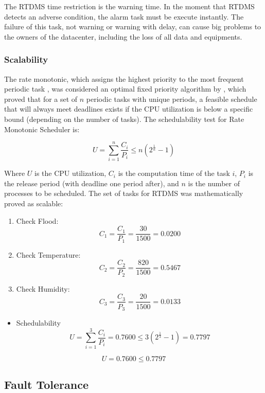 \documentclass[12pt]{article}
\begin{document}
The RTDMS time restriction is the warning time. In the moment that RTDMS detects an adverse condition,
the alarm task must be execute instantly. The failure of this task, not warning or warning with delay,
can cause big problems to the owners of the datacenter, including the loss of all data and equipments.

\subsubsection{Scalability}

The rate monotonic, which assigns the highest priority to the most frequent periodic task \cite{stankovic1996real}, 
was considered an optimal fixed priority algorithm by \cite{liu1973scheduling}, which proved that for 
a set of \(n\) periodic tasks with unique periods, a feasible schedule that will always meet deadlines 
exists if the CPU utilization is below a specific bound (depending on the number of tasks). The schedulability 
test for Rate Monotonic Scheduler is:

\[ \displaystyle U = \sum_{i=1}^{n}\frac{C_i}{P_i} \leq n(2^\frac{1}{n} - 1) \]

Where \(U\) is the CPU utilization, \(C_i\) is the computation time of the task \(i\), \(P_i\) is the release period (with deadline one period after),
and \(n\) is the number of processes to be scheduled. The set of tasks for RTDMS was mathematically proved as scalable:

\begin{enumerate}
 \item Check Flood: \[ C_1 = \frac{C_1}{P_1} = \frac{30}{1500} = 0.0200 \]
 \item Check Temperature: \[ C_2 = \frac{C_2}{P_2} = \frac{820}{1500} = 0.5467 \]
 \item Check Humidity: \[ C_3 = \frac{C_3}{P_3} = \frac{20}{1500} = 0.0133 \]
\end{enumerate}
\begin{itemize}
 \item Schedulability \[ U = \sum_{i=1}^{3}\frac{C_i}{P_i} = 0.7600 \leq 3(2^\frac{1}{3} - 1) = 0.7797 \]
\end{itemize}

\[ U = 0.7600 \leq 0.7797 \]

\subsection{Fault Tolerance}
\end{document}

